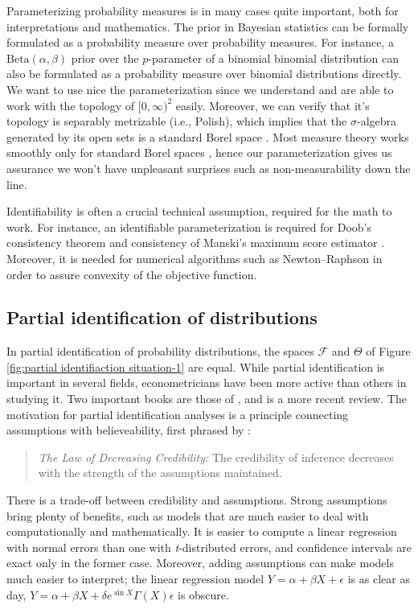 Parameterizing probability measures is in many cases quite important, both for interpretations and mathematics. The prior in Bayesian statistics can be formally formulated as a probability measure over probability measures. For instance, a $\textrm{Beta}(\alpha,\beta)$ prior over the $p$-parameter of a binomial binomial distribution can also be formulated as a probability measure over binomial distributions directly. We want to use nice the parameterization since we understand and are able to work with the topology of $[0,\infty)^2$ easily. Moreover, we can verify that it's topology is separably metrizable (i.e., Polish), which implies that the $\sigma$-algebra generated by its open sets is a standard Borel space \parencite{Kechris2012-nh}. Most measure theory works smoothly only for standard Borel spaces \parencite[][Chapter 1]{Van_der_Vaart1996-dx}, hence our parameterization gives us assurance we won't have unpleasant surprises such as non-measurability down the line. 

Identifiability is often a crucial technical assumption, required for the math to work. For instance, an identifiable parameterization is required for Doob's consistency theorem \parencite{Miller2018-xq} and consistency of Manski's maximum score estimator \parencite{Manski1975-gl}. Moreover, it is needed for numerical algorithms such as Newton--Raphson in order to assure convexity of the objective function.

\subsection{Partial identification of distributions}
In partial identification of probability distributions, the spaces $\mathcal{F}$ and $\Theta$ of Figure \ref{fig:partial identifiaction situation-1} are equal. While partial identification is important in several fields, econometricians have been more active than others in studying it. Two important books are those of \textcite{Manski1999-ab,Manski2003-aq}, and \textcite{Tamer2010-rj} is a more recent review. The motivation for partial identification analyses is a principle connecting assumptions with believeability, first phrased by \textcite[p. 1]{Manski2003-aq}:
\begin{quote}
\emph{The Law of Decreasing Credibility: }The credibility of inference
decreases with the strength of the assumptions maintained.
\end{quote}
There is a trade-off between credibility and assumptions. Strong assumptions bring plenty of benefits, such as models that are much easier to deal with computationally and mathematically. It is easier to compute a linear regression with normal errors than one with \emph{t}-distributed errors, and confidence intervals are exact only in the former case. Moreover, adding assumptions can make models much easier to interpret; the linear regression model $Y=\alpha+\beta X+\epsilon$ is as clear as day, $Y=\alpha+\beta X+\delta e^{\sin X}\Gamma(X)\epsilon$ is obscure. 

